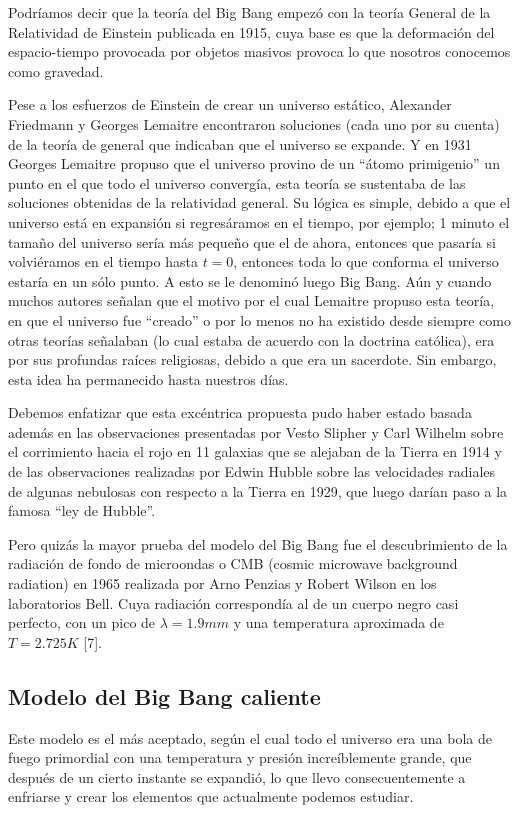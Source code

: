 \documentclass{article}
\begin{document}
Podr\'iamos decir que la teor\'ia del Big Bang empez\'o con la teor\'ia General de la Relatividad de Einstein publicada en 1915, cuya base es que la deformaci\'on del espacio-tiempo provocada por objetos masivos provoca lo que nosotros conocemos como gravedad. 

Pese a los esfuerzos de Einstein de crear un universo est\'atico, Alexander Friedmann y Georges Lemaitre encontraron soluciones (cada uno por su cuenta) de la teor\'ia de general que indicaban que el universo se expande. Y en 1931 Georges Lemaitre propuso que el universo provino de un ``\'atomo primigenio'' un punto en el que todo el universo converg\'ia, esta teor\'ia se sustentaba de las soluciones obtenidas de la relatividad general. Su l\'ogica es simple, debido a que el universo est\'a en expansi\'on si regres\'aramos en el tiempo, por ejemplo; 1 minuto el tama\~no del universo ser\'ia m\'as peque\~no que el de ahora, entonces que pasar\'ia si volvi\'eramos en el tiempo hasta $t=0$, entonces toda lo que conforma el universo estar\'ia en un s\'olo punto. A esto se le denomin\'o luego Big Bang. A\'un y cuando muchos autores se\~nalan que el motivo por el cual Lemaitre propuso esta teor\'ia, en que el universo fue ``creado'' o por lo menos no ha existido desde siempre como otras teor\'ias se\~nalaban (lo cual estaba de acuerdo con la doctrina cat\'olica), era por sus profundas ra\'ices religiosas, debido a que era un sacerdote. Sin embargo, esta idea ha permanecido hasta nuestros d\'ias.

Debemos enfatizar que esta exc\'entrica propuesta pudo haber estado basada adem\'as en las observaciones presentadas por Vesto Slipher y Carl Wilhelm sobre el corrimiento hacia el rojo en 11 galaxias que se alejaban de la Tierra en 1914 y de las observaciones realizadas por Edwin Hubble sobre las velocidades radiales de algunas nebulosas con respecto a la Tierra en 1929, que luego dar\'ian paso a la famosa ``ley de Hubble''.

Pero quiz\'as la mayor prueba del modelo del Big Bang fue el descubrimiento de la radiaci\'on de fondo de microondas o CMB (cosmic microwave background radiation) en 1965 realizada por Arno Penzias y Robert Wilson en los laboratorios Bell.  Cuya radiaci\'on correspond\'ia al de un cuerpo negro casi perfecto, con un pico de $\lambda=1.9 mm$ y una temperatura aproximada de $T=2.725 K$ [7].


\subsection*{Modelo del Big Bang caliente}
Este modelo es el m\'as aceptado, seg\'un el cual todo el universo era una bola de fuego primordial con una temperatura y presi\'on incre\'iblemente grande, que despu\'es de un cierto instante se expandi\'o, lo que llevo consecuentemente a enfriarse y crear los elementos que actualmente podemos estudiar.
\end{document}
